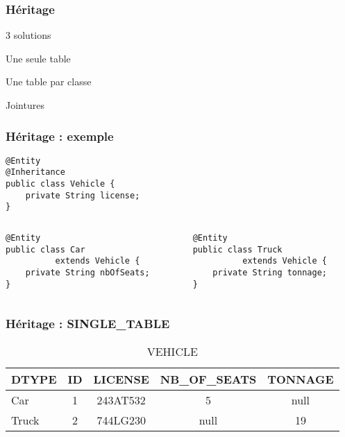 \documentclass[t,12pt]{beamer}
\begin{document}
\begin{frame}
	\frametitle{H\'eritage}

	\begin{block}{3 solutions}
		\begin{description}
			\item<2->[SINGLE\_TABLE :] Une seule table
			\item<3->[TABLE\_PER\_CLASS :] Une table par classe
			\item<4->[JOINED :] Jointures
		\end{description}
	\end{block}
	\pause
\end{frame}

\begin{frame}[fragile]
	\frametitle{H\'eritage : exemple}

	\begin{lstlisting}
@Entity
@Inheritance
public class Vehicle {
    private String license;
}
	\end{lstlisting}

	\begin{columns}
		\begin{column}{0.5\textwidth}
			\begin{lstlisting}
@Entity
public class Car
          extends Vehicle {
    private String nbOfSeats;
}
			\end{lstlisting}
		\end{column}
		\vrule{}
		\begin{column}{0.5\textwidth}
			\begin{lstlisting}
@Entity
public class Truck
          extends Vehicle {
    private String tonnage;
}
			\end{lstlisting}
		\end{column}
	\end{columns}
\end{frame}

\begin{frame}
	\frametitle{H\'eritage : SINGLE\_TABLE}

	\begin{table}
		\caption{VEHICLE}
		\begin{tabular}{l | c | c | c | c}
			DTYPE & ID & LICENSE & NB\_OF\_SEATS & TONNAGE \\
			\hline
			Car & 1 & 243AT532 & 5 & null \\
			Truck & 2 & 744LG230 & null & 19
		\end{tabular}
	\end{table}
\end{frame}
\end{document}
